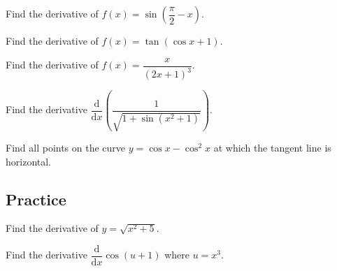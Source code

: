 \begin{example}

Find the derivative of \(f(x)=\sin(\dfrac{\pi}{2}-x)\).

\end{example}
\vspace*{6\baselineskip}

\begin{example}

Find the derivative of \(f(x)=\tan(\cos x+1)\).

\end{example}
\vspace*{6\baselineskip}

\begin{example}

Find the derivative of \(f(x)=\dfrac{x}{(2x+1)^3}\).

\end{example}
\vspace*{6\baselineskip}

\begin{example}
  Find the derivative
  \(\dfrac{\mathrm{d}}{\mathrm{d}x}\left(\dfrac{1}{\sqrt{1+\sin(x^2+1)}}\right)\).
\end{example}
\vspace*{6\baselineskip}

\begin{example}

Find all points on the curve \(y=\cos x-\cos^2x\) at which the tangent
line is horizontal.

\end{example}
\vspace*{6\baselineskip}

\subsection{Practice}

\begin{exercise}

Find the derivative of \(y=\sqrt{x^2+5}\).

\end{exercise}
\vspace*{6\baselineskip}

\begin{exercise}

Find the derivative \(\dfrac{\mathrm{d}}{\mathrm{d}x}\cos(u+1)\) where
\(u=x^3\).

\end{exercise}
\vspace*{6\baselineskip}

